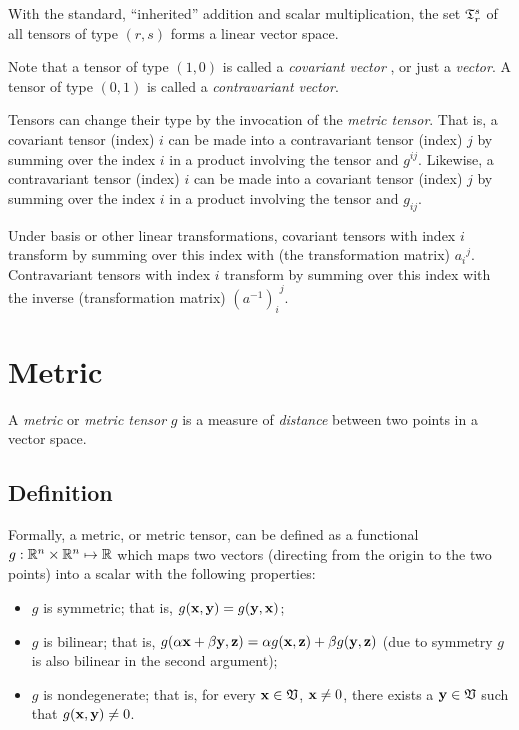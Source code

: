 With the standard, ``inherited'' addition and scalar multiplication,
the set ${\frak T}_r^s$ of all tensors of type $(r,s)$
forms a linear vector space.


Note that a tensor of type $(1,0)$ is called  a
{\em covariant vector}
,
or just a
{\em vector}.
A tensor of type $(0,1)$ is called a
{\em contravariant vector}.

Tensors can change their type by the invocation of the {\em metric tensor}.
That is, a covariant tensor (index) $i$ can be made into a contravariant tensor (index) $j$
by summing over the index $i$ in a product involving the tensor and $g^{ij}$.
Likewise,  a contravariant tensor (index) $i$ can be made into a covariant tensor (index) $j$
by summing over the index $i$ in a product involving the tensor and $g_{ij}$.


Under basis or other linear transformations,
covariant tensors with index $i$ transform by summing over this index with (the transformation matrix) ${a_i}^j$.
Contravariant tensors with index $i$ transform by summing over this index with the inverse (transformation matrix)  ${(a^{-1})_i}^j$.


\section{Metric}

A {\em metric} or {\em metric tensor} $g$ is a measure of {\em distance} between two points in a vector space.




\subsection{Definition}
\label{2011-m-metrict}


Formally, a metric, or metric tensor,  can be defined as a functional $g: {\Bbb R}^n\times{\Bbb R}^n\mapsto {\Bbb R}$
which maps two vectors (directing from the origin to the two points)
into a scalar
with the following properties:
\begin{itemize}
\item
$g$ is symmetric; that is, $g({\bf x},{\bf y})=g({\bf y},{\bf x})$;
\item
$g$ is bilinear; that is,
$g(
\alpha {\bf x} + \beta {\bf y}, {\bf z})
= \alpha g( {\bf x},{\bf z}) + \beta g({\bf y}, {\bf z})
$ (due to symmetry $g$ is also bilinear in the second argument);
\item
$g$ is nondegenerate; that is,
for every ${\bf x}\in {\frak V}$, ${\bf x}\neq 0$, there exists a
${\bf y}\in {\frak V}$ such that $g({\bf x},{\bf y})\neq 0$.
\end{itemize}



